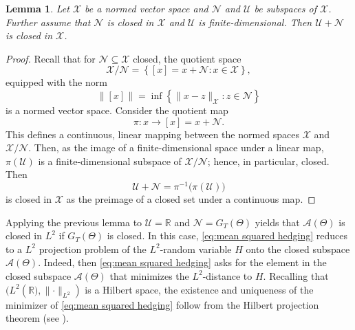 \documentclass[11pt,a4paper,twoside,openany]{report}
\numberwithin{equation}{section}
\theoremstyle{plain} %
\newtheorem{lemma}[theorem]{Lemma}
\theoremstyle{definition} %
\theoremstyle{remark} %
\let\parencite\authnumparencite
\begin{document}
\begin{lemma}\label{lemma:A closed if G closed}
    Let \(\mathcal{X}\) be a normed vector space and \(\mathcal{N}\) and \(\mathcal{U}\) be subspaces of \(\mathcal{X}\). Further assume that \(\mathcal{N}\) is closed in \(\mathcal{X}\) and \(\mathcal{U}\) is finite-dimensional. Then \(\mathcal{U}+\mathcal{N}\) is closed in \(\mathcal{X}\).
\end{lemma}
\begin{proof}
    Recall that for \(\mathcal{N}\subseteq \mathcal{X}\) closed, the quotient space 
    \begin{equation*}
        \mathcal{X}/\mathcal{N}=\left\{[x]=x+\mathcal{N}:x\in \mathcal{X}\right\},
    \end{equation*}
   equipped with the norm
    \begin{equation*}
        \big\lVert [x]\big\rVert = \inf \left\{\lVert x-z\rVert_\mathcal{X}:z\in \mathcal{N}\right\}
    \end{equation*}
    is a normed vector space. Consider the quotient map
    \begin{equation*}
        \pi:x\to[x]=x+\mathcal{N}.
    \end{equation*}
 This defines a continuous, linear mapping between the normed spaces \(\mathcal{X}\) and \(\mathcal{X}/\mathcal{N}\).
    Then, as the image of a finite-dimensional space under a linear map, \(\pi(\mathcal{U})\) is a finite-dimensional subspace of \(\mathcal{X}/\mathcal{N}\); hence, in particular, closed. Then 
    \begin{equation*}
        \mathcal{U}+\mathcal{N}=\pi^{-1}\big(\pi(\mathcal{U})\big)
    \end{equation*}
    is closed in \(\mathcal{X}\) as the preimage of a closed set under a continuous map.  
\end{proof}
Applying the previous lemma to \(\mathcal{U}=\mathbb{R}\) and \(\mathcal{N}=G_T(\Theta)\) yields that \(\mathcal{A}(\Theta)\) is closed in \(L^2\) if \(G_T(\Theta)\) is closed. In this case, \eqref{eq:mean squared hedging} reduces to a \(L^2\) projection problem of the \(L^2\)-random variable \(H\) onto the closed subspace \(\mathcal{A}(\Theta)\). 
Indeed, then \eqref{eq:mean squared hedging} asks for the element in the closed subspace \(\mathcal{A}(\Theta)\) that minimizes the \(L^2\)-distance to \(H\). Recalling that \((L^2(\mathbb{R)},\lVert\cdot\rVert_{L^2})\) is a Hilbert space, the existence and uniqueness of the minimizer of \eqref{eq:mean squared hedging} follow from the Hilbert projection theorem (see \parencite[Thm.~12.3]{Rudin1991FunctionalAnalysis}). 
\end{document}
